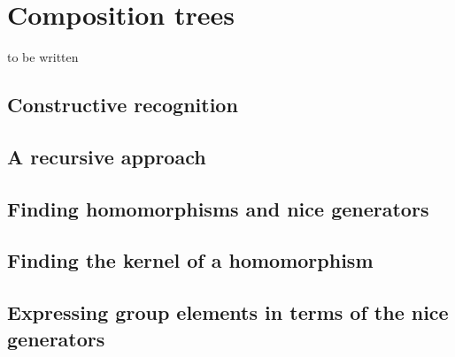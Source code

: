 
\chapter{Composition trees}

to be written

\section{Constructive recognition}

\section{A recursive approach}

\section{Finding homomorphisms and nice generators}

\section{Finding the kernel of a homomorphism}

\section{Expressing group elements in terms of the nice generators}

